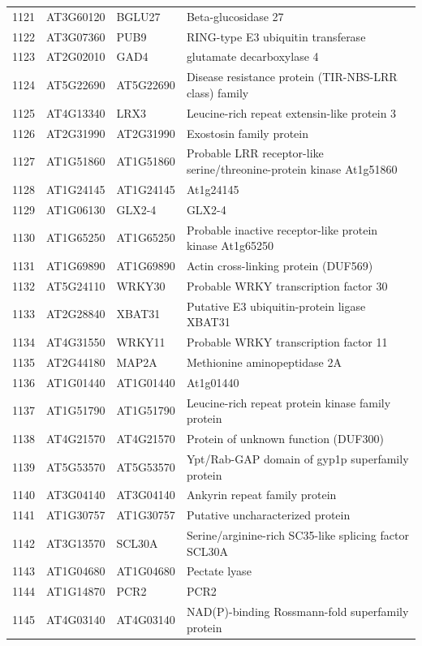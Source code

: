 \documentclass[11pt]{article}
\begin{document}
\begin{center}
\begin{tabular}{rlll}
1121 & AT3G60120 & BGLU27 & Beta-glucosidase 27\\
1122 & AT3G07360 & PUB9 & RING-type E3 ubiquitin transferase\\
1123 & AT2G02010 & GAD4 & glutamate decarboxylase 4\\
1124 & AT5G22690 & AT5G22690 & Disease resistance protein (TIR-NBS-LRR class) family\\
1125 & AT4G13340 & LRX3 & Leucine-rich repeat extensin-like protein 3\\
1126 & AT2G31990 & AT2G31990 & Exostosin family protein\\
1127 & AT1G51860 & AT1G51860 & Probable LRR receptor-like serine/threonine-protein kinase At1g51860\\
1128 & AT1G24145 & AT1G24145 & At1g24145\\
1129 & AT1G06130 & GLX2-4 & GLX2-4\\
1130 & AT1G65250 & AT1G65250 & Probable inactive receptor-like protein kinase At1g65250\\
1131 & AT1G69890 & AT1G69890 & Actin cross-linking protein (DUF569)\\
1132 & AT5G24110 & WRKY30 & Probable WRKY transcription factor 30\\
1133 & AT2G28840 & XBAT31 & Putative E3 ubiquitin-protein ligase XBAT31\\
1134 & AT4G31550 & WRKY11 & Probable WRKY transcription factor 11\\
1135 & AT2G44180 & MAP2A & Methionine aminopeptidase 2A\\
1136 & AT1G01440 & AT1G01440 & At1g01440\\
1137 & AT1G51790 & AT1G51790 & Leucine-rich repeat protein kinase family protein\\
1138 & AT4G21570 & AT4G21570 & Protein of unknown function (DUF300)\\
1139 & AT5G53570 & AT5G53570 & Ypt/Rab-GAP domain of gyp1p superfamily protein\\
1140 & AT3G04140 & AT3G04140 & Ankyrin repeat family protein\\
1141 & AT1G30757 & AT1G30757 & Putative uncharacterized protein\\
1142 & AT3G13570 & SCL30A & Serine/arginine-rich SC35-like splicing factor SCL30A\\
1143 & AT1G04680 & AT1G04680 & Pectate lyase\\
1144 & AT1G14870 & PCR2 & PCR2\\
1145 & AT4G03140 & AT4G03140 & NAD(P)-binding Rossmann-fold superfamily protein\\

\end{tabular}
\end{center}
\end{document}

